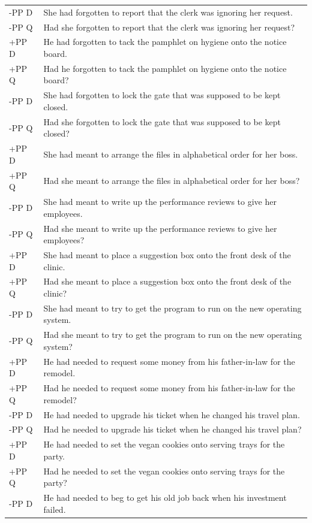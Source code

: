 \documentclass[12pt,oneside]{book}
\begin{document}
\begin{longtable}{ll}
-PP D & She had forgotten to report that the clerk was ignoring her request.\\
-PP Q & Had she forgotten to report that the clerk was ignoring her request?\\
\addlinespace
+PP D & He had forgotten to tack the pamphlet on hygiene onto the notice board.\\
+PP Q & Had he forgotten to tack the pamphlet on hygiene onto the notice board?\\
\addlinespace
-PP D & She had forgotten to lock the gate that was supposed to be kept closed.\\
-PP Q & Had she forgotten to lock the gate that was supposed to be kept closed?\\
\addlinespace
+PP D & She had meant to arrange the files in alphabetical order for her boss.\\
+PP Q & Had she meant to arrange the files in alphabetical order for her boss?\\
\addlinespace
-PP D & She had meant to write up the performance reviews to give her employees.\\
-PP Q & Had she meant to write up the performance reviews to give her employees?\\
\addlinespace
+PP D & She had meant to place a suggestion box onto the front desk of the clinic.\\
+PP Q & Had she meant to place a suggestion box onto the front desk of the clinic?\\
\addlinespace
-PP D & She had meant to try to get the program to run on the new operating system.\\
-PP Q & Had she meant to try to get the program to run on the new operating system?\\
\addlinespace
+PP D & He had needed to request some money from his father-in-law for the remodel.\\
+PP Q & Had he needed to request some money from his father-in-law for the remodel?\\
\addlinespace
-PP D & He had needed to upgrade his ticket when he changed his travel plan.\\
-PP Q & Had he needed to upgrade his ticket when he changed his travel plan?\\
\addlinespace
+PP D & He had needed to set the vegan cookies onto serving trays for the party.\\
+PP Q & Had he needed to set the vegan cookies onto serving trays for the party?\\
\addlinespace
-PP D & He had needed to beg to get his old job back when his investment failed.\\

\end{longtable}
\end{document}

